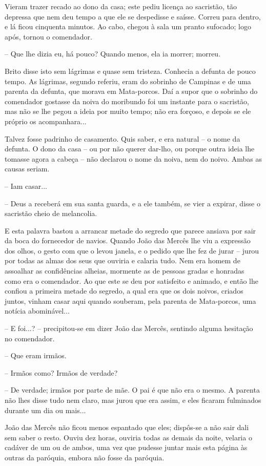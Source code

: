 Vieram trazer recado ao dono da casa; este pediu licença ao sacristão,
tão depressa que nem deu tempo a que ele se despedisse e saísse. Correu
para dentro, e lá ficou cinquenta minutos. Ao cabo, chegou à sala um
pranto sufocado; logo após, tornou o comendador.

-- Que lhe dizia eu, há pouco? Quando menos, ela ia morrer; morreu.

Brito disse isto sem lágrimas e quase sem tristeza. Conhecia a defunta
de pouco tempo. As lágrimas, segundo referiu, eram do sobrinho de
Campinas e de uma parenta da defunta, que morava em Mata-porcos. Daí a
supor que o sobrinho do comendador gostasse da noiva do moribundo foi um
instante para o sacristão, mas não se lhe pegou a ideia por muito tempo;
não era forçoso, e depois se ele próprio os acompanhara...

Talvez fosse padrinho de casamento. Quis saber, e era natural -- o nome
da defunta. O dono da casa -- ou por não querer dar-lho, ou porque outra
ideia lhe tomasse agora a cabeça -- não declarou o nome da noiva, nem do
noivo. Ambas as causas seriam.

-- Iam casar...

-- Deus a receberá em sua santa guarda, e a ele também, se vier a
expirar, disse o sacristão cheio de melancolia.

E esta palavra bastou a arrancar metade do segredo que parece ansiava
por sair da boca do fornecedor de navios. Quando João das Mercês lhe viu
a expressão dos olhos, o gesto com que o levou janela, e o pedido que
lhe fez de jurar -- jurou por todas as almas dos seus que ouviria e
calaria tudo. Nem era homem de assoalhar as confidências alheias,
mormente as de pessoas gradas e honradas como era o comendador. Ao que
este se deu por satisfeito e animado, e então lhe confiou a primeira
metade do segredo, a qual era que os dois noivos, criados juntos, vinham
casar aqui quando souberam, pela parenta de Mata-porcos, uma notícia
abominável...

-- E foi...? -- precipitou-se em dizer João das Mercês, sentindo alguma
hesitação no comendador.

-- Que eram irmãos.

-- Irmãos como? Irmãos de verdade?

-- De verdade; irmãos por parte de mãe. O pai é que não era o mesmo. A
parenta não lhes disse tudo nem claro, mas jurou que era assim, e eles
ficaram fulminados durante um dia ou mais...

João das Mercês não ficou menos espantado que eles; dispôs-se a não sair
dali sem saber o resto. Ouviu dez horas, ouviria todas as demais da
noite, velaria o cadáver de um ou de ambos, uma vez que pudesse juntar
mais esta página às outras da paróquia, embora não fosse da paróquia.


